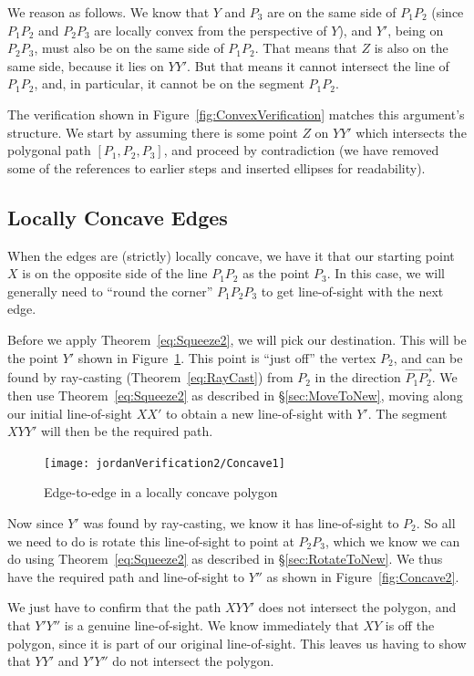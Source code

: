 We reason as follows. We know that $Y$ and $P_3$ are on the same side of $P_1P_2$ (since $P_1P_2$ and $P_2P_3$ are locally convex from the perspective of $Y$), and $Y'$, being on $P_2P_3$, must also be on the same side of $P_1P_2$. That means that $Z$ is also on the same side, because it lies on $YY'$. But that means it cannot intersect the line of $P_1P_2$, and, in particular, it cannot be on the segment $P_1P_2$.

The verification shown in Figure~\ref{fig:ConvexVerification} matches this argument's structure.  We start by assuming there is some point $Z$ on $YY'$ which intersects the polygonal path $[P_1,P_2,P_3]$, and proceed by contradiction (we have removed some of the references to earlier steps and inserted ellipses for readability). 

\subsection{Locally Concave Edges}
When the edges are (strictly) locally concave, we have it that our starting point $X$ is on the opposite side of the line $P_1P_2$ as the point $P_3$. In this case, we will generally need to ``round the corner'' $P_1P_2P_3$ to get line-of-sight with the next edge. 

Before we apply Theorem~\ref{eq:Squeeze2}, we will pick our destination. This will be the point $Y'$ shown in Figure~\ref{fig:Concave1}. This point is ``just off'' the vertex $P_2$, and can be found by ray-casting (Theorem~\ref{eq:RayCast}) from $P_2$ in the direction $\overrightarrow{P_1P_2}$. We then use Theorem~\ref{eq:Squeeze2} as described in \S\ref{sec:MoveToNew}, moving along our initial line-of-sight $XX'$ to obtain a new line-of-sight with $Y'$. The segment $XYY'$ will then be the required path.

\begin{figure}
\centering\texttt{[image: jordanVerification2/Concave1]}
\caption{Edge-to-edge in a locally concave polygon}
\label{fig:Concave1}
\end{figure}

Now since $Y'$ was found by ray-casting, we know it has line-of-sight to $P_2$. So all we need to do is rotate this line-of-sight to point at $P_2P_3$, which we know we can do using Theorem~\ref{eq:Squeeze2} as described in \S\ref{sec:RotateToNew}. We thus have the required path and line-of-sight to $Y''$ as shown in Figure~\ref{fig:Concave2}.

We just have to confirm that the path $XYY'$ does not intersect the polygon, and that $Y'Y''$ is a genuine line-of-sight. We know immediately that $XY$ is off the polygon, since it is part of our original line-of-sight. This leaves us having to show that $YY'$ and $Y'Y''$ do not intersect the polygon. 

